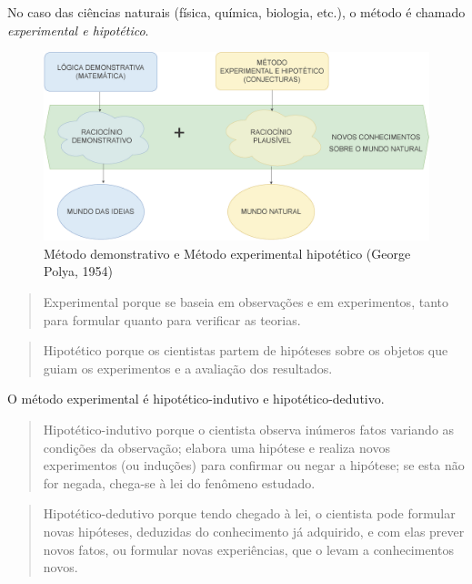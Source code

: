 \documentclass[
]{book}
\begin{document}
No caso das ciências naturais (física, química, biologia, etc.), o método é chamado \emph{experimental e hipotético}.

\hfill\break

\begin{figure}

{\centering \includegraphics[width=0.8\linewidth]{images11/polya} 

}

\caption{Método demonstrativo e Método experimental hipotético (George Polya, 1954) }\label{fig:unnamed-chunk-115}
\end{figure}

\hfill\break

\begin{quote}
Experimental porque se baseia em observações e em experimentos, tanto para formular quanto para verificar as teorias.
\end{quote}

\hfill\break

\begin{quote}
Hipotético porque os cientistas partem de hipóteses sobre os objetos que guiam os experimentos e a avaliação dos resultados.
\end{quote}

\hfill\break

O método experimental é hipotético-indutivo e hipotético-dedutivo.

\hfill\break

\begin{quote}
Hipotético-indutivo porque o cientista observa inúmeros fatos variando as condições da observação; elabora uma hipótese e realiza novos experimentos (ou induções) para confirmar ou negar a hipótese; se esta não for negada, chega-se à lei do fenômeno estudado.
\end{quote}

\hfill\break

\begin{quote}
Hipotético-dedutivo porque tendo chegado à lei, o cientista pode formular novas hipóteses, deduzidas do conhecimento já adquirido, e com elas prever novos fatos, ou formular novas experiências, que o levam a conhecimentos novos.
\end{quote}
\end{document}
